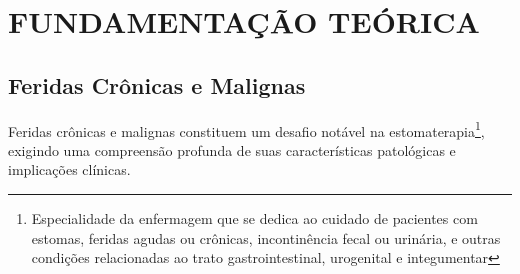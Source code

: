 \section{FUNDAMENTAÇÃO TEÓRICA}

\subsection{Feridas Crônicas e Malignas}

Feridas crônicas e malignas constituem um desafio notável na estomaterapia\footnote{Especialidade da enfermagem que se dedica ao cuidado de pacientes com estomas, feridas agudas ou crônicas, incontinência fecal ou urinária, e outras condições relacionadas ao trato gastrointestinal, urogenital e integumentar}, exigindo uma compreensão profunda de suas características patológicas e implicações clínicas.

